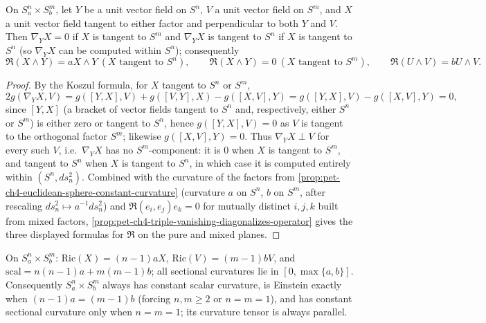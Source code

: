 \begin{proposition}
  \label{prop:pet-ch4-product-sphere-curvature}
  On $S^n_a\times S^m_b$, let $Y$ be a unit vector field on $S^n$, $V$ a unit
  vector field on $S^m$, and $X$ a unit vector field tangent to either factor and
  perpendicular to both $Y$ and $V$. Then $\nabla_YX=0$ if $X$ is tangent to
  $S^m$ and $\nabla_YX$ is tangent to $S^n$ if $X$ is tangent to $S^n$ (so
  $\nabla_YX$ can be computed within $S^n$); consequently
  \[
    \mathfrak{R}(X\wedge Y)=aX\wedge Y\ (X\text{ tangent to }S^n),\qquad
    \mathfrak{R}(X\wedge Y)=0\ (X\text{ tangent to }S^m),\qquad
    \mathfrak{R}(U\wedge V)=bU\wedge V.
  \]
\end{proposition}
\begin{proof}
  By the Koszul formula, for $X$ tangent to $S^n$ or $S^m$,
  \[
    2g(\nabla_YX,V)=g([Y,X],V)+g([V,Y],X)-g([X,V],Y)=g([Y,X],V)-g([X,V],Y)=0,
  \]
  since $[Y,X]$ (a bracket of vector fields tangent to $S^n$ and, respectively,
  either $S^n$ or $S^m$) is either zero or tangent to $S^n$, hence
  $g([Y,X],V)=0$ as $V$ is tangent to the orthogonal factor $S^m$; likewise
  $g([X,V],Y)=0$. Thus $\nabla_YX\perp V$ for every such $V$, i.e.\ $\nabla_YX$
  has no $S^m$-component: it is $0$ when $X$ is tangent to $S^m$, and tangent to
  $S^n$ when $X$ is tangent to $S^n$, in which case it is computed entirely
  within $(S^n,ds_n^2)$. Combined with the curvature of the factors from
  \cref{prop:pet-ch4-euclidean-sphere-constant-curvature} (curvature $a$ on
  $S^n$, $b$ on $S^m$, after rescaling $ds_n^2\mapsto a^{-1}ds_n^2$) and
  $\mathfrak{R}(e_i,e_j)e_k=0$ for mutually distinct $i,j,k$ built from mixed
  factors, \cref{prop:pet-ch4-triple-vanishing-diagonalizes-operator} gives the
  three displayed formulas for $\mathfrak{R}$ on the pure and mixed planes.
\end{proof}

\begin{remark}
  \label{rem:pet-ch4-product-sphere-ricci-einstein}
  On $S^n_a\times S^m_b$: $\mathrm{Ric}(X)=(n-1)aX$, $\mathrm{Ric}(V)=(m-1)bV$, and
  $\mathrm{scal}=n(n-1)a+m(m-1)b$; all sectional curvatures lie in
  $[0,\max\{a,b\}]$. Consequently $S^n_a\times S^m_b$ always has constant scalar
  curvature, is Einstein exactly when $(n-1)a=(m-1)b$ (forcing $n,m\ge2$ or
  $n=m=1$), and has constant sectional curvature only when $n=m=1$; its curvature
  tensor is always parallel.
\end{remark}

